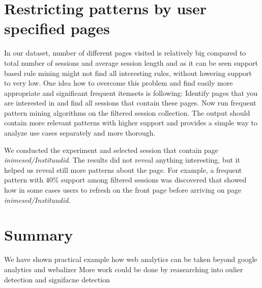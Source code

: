 \documentclass[english,a4paper]{article}
\begin{document}
\section{Restricting patterns by user specified pages}

In our dataset, number of different pages visited is relatively big compared to total number of sessions and average session length and as it can be seen support based rule mining might not find all interesting rules, without lowering support to very low. One idea how to overcome this problem and find easily more appropriate and significant frequent itemsets is following: Identify pages that you are interested in and find all sessions that contain these pages. Now run frequent pattern mining algorithms on the filtered session collection. The output should contain more relevant patterns with higher support and provides a simple way to analyze use cases separately and more thorough.

We conducted the experiment and selected session that contain page \emph{inimesed/Instituudid}. The results did not reveal anything interesting, but it helped us reveal still more patterns about the page. For example, a   frequent pattern with $40\%$ support among filtered sessions was discovered that showed how in some cases users to refresh on the front page before arriving on page \emph{inimesed/Instituudid}.

\section{Summary}
We have shown practical example how web analytics can be taken beyond google analytics and webalizer
More work could be done by reasearching into oulier detection and signifacne detection












\end{document}

